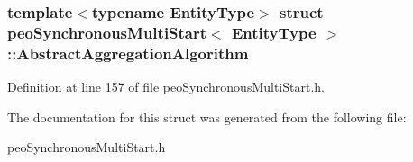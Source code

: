 \subsubsection*{template$<$typename Entity\-Type$>$ struct peo\-Synchronous\-Multi\-Start$<$ Entity\-Type $>$::Abstract\-Aggregation\-Algorithm}





Definition at line 157 of file peo\-Synchronous\-Multi\-Start.h.

The documentation for this struct was generated from the following file:\begin{CompactItemize}
\item 
peo\-Synchronous\-Multi\-Start.h\end{CompactItemize}
